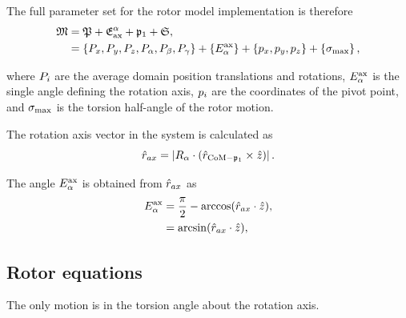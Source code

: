 The full parameter set for the rotor model implementation is therefore
\begin{subequations}
\begin{align}
    \mathfrak{M} &= \mathfrak{P} + \mathfrak{E}^\alpha_\textrm{ax} + \mathfrak{p}_1 + \mathfrak{S}, \\
              &= \left\{ P_x, P_y, P_z, P_\alpha, P_\beta, P_\gamma \right\} + \left\{ E_\alpha^{\textrm{ax}} \right\} + \left\{ p_x, p_y, p_z \right\} + \left\{ \sigma_\textrm{max} \right\},
\end{align}
\end{subequations}

where $P_i$ are the average domain position translations and rotations, $E_\alpha^{\textrm{ax}}$ is the single angle defining the rotation axis, $p_i$ are the coordinates of the pivot point, and $\sigma_\textrm{max}$ is the torsion half-angle of the rotor motion.

The rotation axis vector in the system is calculated as
\begin{equation}
    \hat{r}_{ax} = \left| R_\alpha \cdot (\hat{r}_{\textrm{CoM}-\mathfrak{p}_1} \times \hat{z}) \right| .
\end{equation}

The angle $E_\alpha^{\textrm{ax}}$ is obtained from $\hat{r}_{ax}$ as
\begin{subequations}
\begin{align}
    E_\alpha^{\textrm{ax}} &= \frac{\pi}{2} - \arccos(\hat{r}_{ax} \cdot \hat{z}), \\
              &= \arcsin(\hat{r}_{ax} \cdot \hat{z}),
\end{align}
\end{subequations}


\subsection{Rotor equations}

The only motion is in the torsion angle about the rotation axis.

